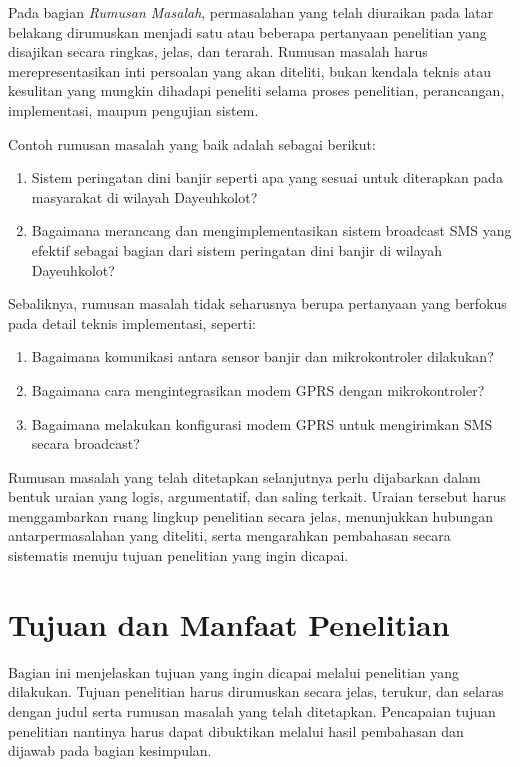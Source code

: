 Pada bagian \emph{Rumusan Masalah}, permasalahan yang telah diuraikan pada latar belakang dirumuskan menjadi satu atau beberapa pertanyaan penelitian yang disajikan secara ringkas, jelas, dan terarah. Rumusan masalah harus merepresentasikan inti persoalan yang akan diteliti, bukan kendala teknis atau kesulitan yang mungkin dihadapi peneliti selama proses penelitian, perancangan, implementasi, maupun pengujian sistem.

Contoh rumusan masalah yang baik adalah sebagai berikut:

\begin{enumerate}[topsep=0pt,itemsep=0pt,parsep=0pt,leftmargin=*]
\item Sistem peringatan dini banjir seperti apa yang sesuai untuk diterapkan pada masyarakat di wilayah Dayeuhkolot?
\item Bagaimana merancang dan mengimplementasikan sistem broadcast SMS yang efektif sebagai bagian dari sistem peringatan dini banjir di wilayah Dayeuhkolot?
\end{enumerate}

Sebaliknya, rumusan masalah tidak seharusnya berupa pertanyaan yang berfokus pada detail teknis implementasi, seperti:

\begin{enumerate}[topsep=0pt,itemsep=0pt,parsep=0pt,leftmargin=*]
\item Bagaimana komunikasi antara sensor banjir dan mikrokontroler dilakukan?
\item Bagaimana cara mengintegrasikan modem GPRS dengan mikrokontroler?
\item Bagaimana melakukan konfigurasi modem GPRS untuk mengirimkan SMS secara broadcast?
\end{enumerate}

Rumusan masalah yang telah ditetapkan selanjutnya perlu dijabarkan dalam bentuk uraian yang logis, argumentatif, dan saling terkait. Uraian tersebut harus menggambarkan ruang lingkup penelitian secara jelas, menunjukkan hubungan antarpermasalahan yang diteliti, serta mengarahkan pembahasan secara sistematis menuju tujuan penelitian yang ingin dicapai.


\section{Tujuan dan Manfaat Penelitian}
Bagian ini menjelaskan tujuan yang ingin dicapai melalui penelitian yang dilakukan. Tujuan penelitian harus dirumuskan secara jelas, terukur, dan selaras dengan judul serta rumusan masalah yang telah ditetapkan. Pencapaian tujuan penelitian nantinya harus dapat dibuktikan melalui hasil pembahasan dan dijawab pada bagian kesimpulan.

